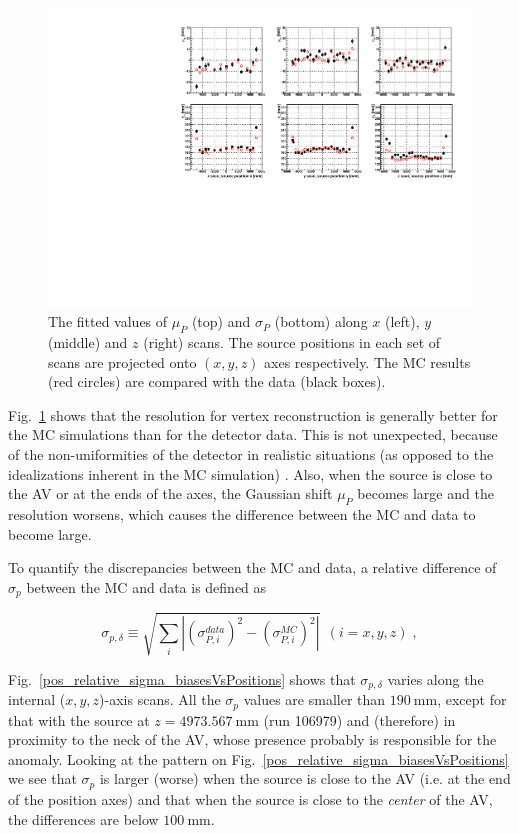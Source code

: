 \begin{figure}
	\centering
	\includegraphics[width=16cm]{N16_rat6176_muPandSigmaP_xyzScans.pdf}
	\caption[The fitted values of $\mu_P$ and $\sigma_P$ along $x$, $y$ and $z$-scans.]{The fitted values of $\mu_P$ (top) and $\sigma_P$ (bottom) along $x$ (left), $y$ (middle) and $z$ (right) scans. The source positions in each set of scans are projected onto $(x, y, z)$ axes respectively. The MC results (red circles) are compared with the data (black boxes).	\label{MPWscanXYZResols}}
\end{figure}

Fig.~\ref{MPWscanXYZResols} shows that the resolution for vertex reconstruction is generally better for the MC simulations than for the detector data. This is not unexpected, because of the non-uniformities of the detector in realistic situations (as opposed to the idealizations inherent in the MC simulation) \cite{waterunidoc}. Also, when the source is close to the AV or at the ends of the axes, the Gaussian shift $\mu_P$ becomes large and the resolution worsens, which causes the difference between the MC and data to become large.

To quantify the discrepancies between the MC and data, a relative difference of $\sigma_p$ between the MC and data is defined as \cite{waterunidoc}

\begin{equation}
\sigma_{p,\delta}\equiv\sqrt{\sum_i|(\sigma^{data}_{P,i})^2-(\sigma^{MC}_{P,i})^2|}~~(i=x,y,z)\; ,
\end{equation}

Fig.~\ref{pos_relative_sigma_biasesVsPositions} shows that $\sigma_{p,\delta}$ varies along the internal ($x, y, z$)-axis scans. All the $\sigma_p$ values are smaller than $190~$mm, except for that with the source at $z=4973.567~$mm (run 106979) and (therefore) in proximity to the neck of the AV, whose presence probably is responsible for the anomaly. Looking at the pattern on Fig.~\ref{pos_relative_sigma_biasesVsPositions} we see that $\sigma_p$ is larger (worse) when the source is close to the AV (i.e. at the end of the position axes) and that when the source is close to the {\em center} of the AV, the differences are below $100~$mm.


